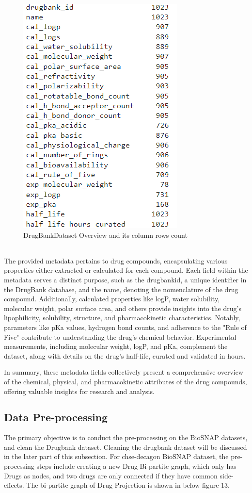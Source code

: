 \documentclass[journal,transmag]{J-NaNA}
\begin{document}
\begin{figure}[htbp]
    \centering
    \includegraphics[width=0.4\linewidth]{Data Exploration_Main.png} %
    \caption{DrugBankDataset Overview and its column rows count}
    \label{fig:chchse-decagon visualization metrics}
\end{figure}
\\
The provided metadata pertains to drug compounds, encapsulating various properties either extracted or calculated for each compound. Each field within the metadata serves a distinct purpose, such as the drugbankid, a unique identifier in the DrugBank database, and the name, denoting the nomenclature of the drug compound. Additionally, calculated properties like logP, water solubility, molecular weight, polar surface area, and others provide insights into the drug's lipophilicity, solubility, structure, and pharmacokinetic characteristics. Notably, parameters like pKa values, hydrogen bond counts, and adherence to the "Rule of Five" contribute to understanding the drug's chemical behavior. Experimental measurements, including molecular weight, logP, and pKa, complement the dataset, along with details on the drug's half-life, curated and validated in hours.

In summary, these metadata fields collectively present a comprehensive overview of the chemical, physical, and pharmacokinetic attributes of the drug compounds, offering valuable insights for research and analysis.


\subsection{Data Pre-processing}
The primary objective is to conduct the pre-processing on the BioSNAP datasets, and clean the Drugbank dataset. Cleaning the drugbank dataset will be discussed in the later part of this subsection. For chse-decagon BioSNAP dataset, the pre-processing steps include creating a new Drug Bi-partite graph, which only has Drugs as nodes, and two drugs are only connected if they have common side-effects. The bi-partite graph of  Drug Projection is shown in below figure 13.
\end{document}
